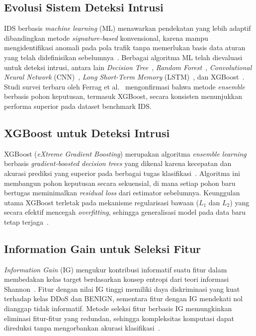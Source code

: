 \documentclass[conference,a4paper]{IEEEtran}
\begin{document}
\subsection{Evolusi Sistem Deteksi Intrusi}

IDS berbasis \textit{machine learning} (ML) menawarkan pendekatan yang lebih adaptif dibandingkan
metode \textit{signature-based} konvensional, karena mampu mengidentifikasi anomali pada pola trafik
tanpa memerlukan basis data aturan yang telah didefinisikan sebelumnya~\cite{ref_chandola2009}.
Berbagai algoritma ML telah dievaluasi untuk deteksi intrusi, antara lain
\textit{Decision Tree}~\cite{ref_dt_ids}, \textit{Random Forest}~\cite{ref_ullah2020},
\textit{Convolutional Neural Network} (CNN)~\cite{ref_cnn_ids}, \textit{Long Short-Term Memory} (LSTM)~\cite{ref_lstm_ids},
dan XGBoost~\cite{ref_thakkar2020}. Studi survei terbaru oleh Ferrag et al.~\cite{ref_ahmad2020}
mengonfirmasi bahwa metode \textit{ensemble} berbasis pohon keputusan, termasuk XGBoost, secara
konsisten menunjukkan performa superior pada dataset benchmark IDS.

\subsection{XGBoost untuk Deteksi Intrusi}

XGBoost (\textit{eXtreme Gradient Boosting}) merupakan algoritma \textit{ensemble learning} berbasis
\textit{gradient-boosted decision trees} yang dikenal karena kecepatan dan akurasi prediksi
yang superior pada berbagai tugas klasifikasi~\cite{ref_xgboost2016}. Algoritma ini membangun
pohon keputusan secara sekuensial, di mana setiap pohon baru bertugas meminimalkan
\textit{residual loss} dari estimator sebelumnya. Keunggulan utama XGBoost terletak pada mekanisme
regularisasi bawaan ($L_1$ dan $L_2$) yang secara efektif mencegah \textit{overfitting}, sehingga
generalisasi model pada data baru tetap terjaga~\cite{ref_xgboost2016}.

\subsection{Information Gain untuk Seleksi Fitur}

\textit{Information Gain} (IG) mengukur kontribusi informatif suatu fitur dalam membedakan kelas
target berdasarkan konsep entropi dari teori informasi Shannon~\cite{ref_shannon1948}. Fitur
dengan nilai IG tinggi memiliki daya diskriminasi yang kuat terhadap kelas DDoS dan BENIGN,
sementara fitur dengan IG mendekati nol dianggap tidak informatif. Metode seleksi fitur
berbasis IG memungkinkan eliminasi fitur-fitur yang redundan, sehingga kompleksitas
komputasi dapat direduksi tanpa mengorbankan akurasi klasifikasi~\cite{ref_guyon2003}.
\end{document}
